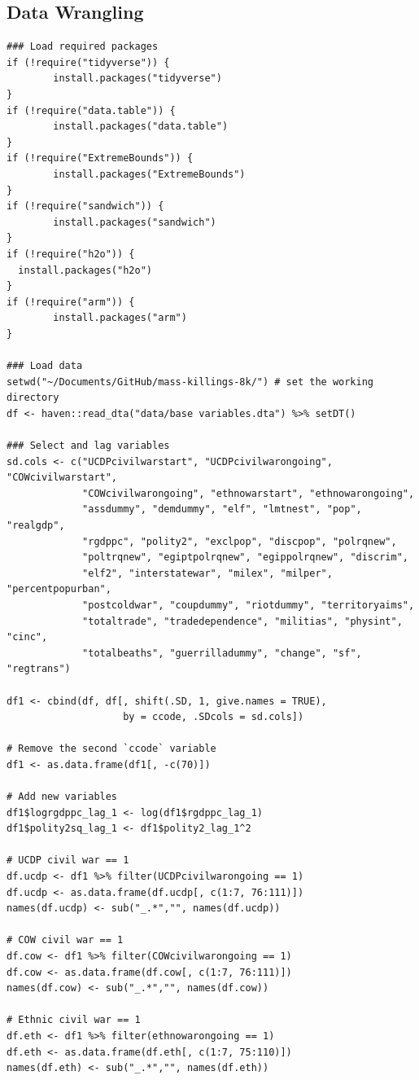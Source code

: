 \documentclass[a4paper,12pt]{article}
\begin{document}
\subsection{Data Wrangling}

\scriptsize

\begin{verbatim}
### Load required packages
if (!require("tidyverse")) {
        install.packages("tidyverse")
}
if (!require("data.table")) {
        install.packages("data.table")
}
if (!require("ExtremeBounds")) {
        install.packages("ExtremeBounds")
}
if (!require("sandwich")) {
        install.packages("sandwich")
}
if (!require("h2o")) {
  install.packages("h2o")
}
if (!require("arm")) {
        install.packages("arm")
}

### Load data
setwd("~/Documents/GitHub/mass-killings-8k/") # set the working directory
df <- haven::read_dta("data/base variables.dta") %>% setDT()

### Select and lag variables
sd.cols <- c("UCDPcivilwarstart", "UCDPcivilwarongoing", "COWcivilwarstart",
             "COWcivilwarongoing", "ethnowarstart", "ethnowarongoing",
             "assdummy", "demdummy", "elf", "lmtnest", "pop", "realgdp",
             "rgdppc", "polity2", "exclpop", "discpop", "polrqnew",
             "poltrqnew", "egiptpolrqnew", "egippolrqnew", "discrim",
             "elf2", "interstatewar", "milex", "milper", "percentpopurban",
             "postcoldwar", "coupdummy", "riotdummy", "territoryaims",
             "totaltrade", "tradedependence", "militias", "physint", "cinc",
             "totalbeaths", "guerrilladummy", "change", "sf", "regtrans")

df1 <- cbind(df, df[, shift(.SD, 1, give.names = TRUE),
                    by = ccode, .SDcols = sd.cols]) 

# Remove the second `ccode` variable
df1 <- as.data.frame(df1[, -c(70)])

# Add new variables
df1$logrgdppc_lag_1 <- log(df1$rgdppc_lag_1)
df1$polity2sq_lag_1 <- df1$polity2_lag_1^2

# UCDP civil war == 1
df.ucdp <- df1 %>% filter(UCDPcivilwarongoing == 1)
df.ucdp <- as.data.frame(df.ucdp[, c(1:7, 76:111)])
names(df.ucdp) <- sub("_.*","", names(df.ucdp)) 

# COW civil war == 1
df.cow <- df1 %>% filter(COWcivilwarongoing == 1)
df.cow <- as.data.frame(df.cow[, c(1:7, 76:111)])
names(df.cow) <- sub("_.*","", names(df.cow)) 

# Ethnic civil war == 1
df.eth <- df1 %>% filter(ethnowarongoing == 1)
df.eth <- as.data.frame(df.eth[, c(1:7, 75:110)])
names(df.eth) <- sub("_.*","", names(df.eth)) 


\end{verbatim}
\end{document}

